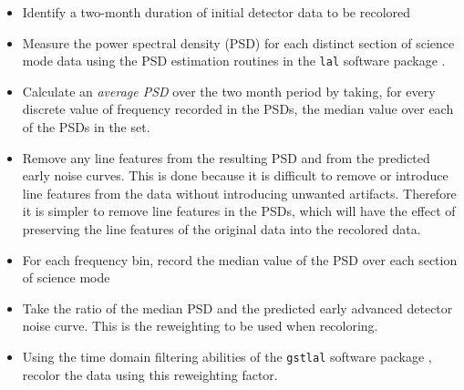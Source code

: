 \begin{itemize}
 \item Identify a two-month duration of initial detector data to be 
recolored
 \item Measure the power spectral density (PSD) for each distinct section 
of science mode data using the PSD estimation routines in the \texttt{lal} 
software package \cite{LAL}.
 \item Calculate an \emph{average PSD} over the two month period by taking, for
every discrete value of frequency recorded in the PSDs, the median value over
each of the PSDs in the set.
 \item Remove any line features from the resulting PSD and from the predicted
early noise curves. This is done because it is difficult to remove or introduce 
line features from the data without introducing unwanted artifacts. Therefore 
it is simpler to remove line features in the PSDs, which will have the effect 
of preserving the line features of the original data into the recolored 
data.
 \item For each frequency bin, record the median value of the PSD over each 
section of science mode
 \item Take the ratio of the median PSD and the predicted early advanced
detector noise curve.
 This is the reweighting to be used when recoloring.
 \item Using the time domain filtering abilities of the \texttt{gstlal}
software package \cite{GSTLAL}, recolor the data using this reweighting factor.
\end{itemize}

